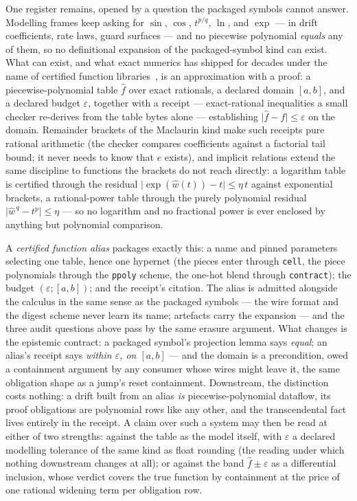 One register remains, opened by a question the packaged symbols
cannot answer. Modelling frames keep asking for $\sin$, $\cos$,
$t^{p/q}$, $\ln$, and $\exp$ --- in drift coefficients, rate laws,
guard surfaces --- and no piecewise polynomial \emph{equals} any of
them, so no definitional expansion of the packaged-symbol kind can
exist. What can exist, and what exact numerics has shipped for
decades under the name of certified function
libraries~\cite{muller2016elementary}, is an
approximation with a proof: a piecewise-polynomial table $\hat f$
over exact rationals, a declared domain $[a, b]$, and a declared
budget $\varepsilon$, together with a receipt --- exact-rational
inequalities a small checker re-derives from the table bytes alone
--- establishing $\lvert \hat f - f \rvert \le \varepsilon$ on the
domain. Remainder brackets of the Maclaurin kind make such receipts
pure rational arithmetic (the checker compares coefficients against
a factorial tail bound; it never needs to know that $e$ exists), and
implicit relations extend the same discipline to functions the
brackets do not reach directly: a logarithm table is certified
through the residual $\lvert \exp(\hat w(t)) - t \rvert \le
\eta\, t$ against exponential brackets, a rational-power table
through the purely polynomial residual $\lvert \hat w^{\,q} - t^p
\rvert \le \eta$ --- so no logarithm and no fractional power is ever
enclosed by anything but polynomial comparison.

A \emph{certified function alias} packages exactly this: a name and
pinned parameters selecting one table, hence one hypernet (the
pieces enter through \texttt{cell}, the piece polynomials through
the \texttt{ppoly} scheme, the one-hot blend through
\texttt{contract}); the budget $(\varepsilon; [a,b])$; and the
receipt's citation. The alias is admitted alongside the calculus in
the same sense as the packaged symbols --- the wire format and the
digest scheme never learn its name; artefacts carry the expansion
--- and the three audit questions above pass by the same erasure
argument. What changes is the epistemic contract: a packaged
symbol's projection lemma says \emph{equal}; an alias's receipt says
\emph{within $\varepsilon$, on $[a,b]$} --- and the domain is a
precondition, owed a containment argument by any consumer whose
wires might leave it, the same obligation shape as a jump's
reset containment. Downstream, the distinction costs nothing: a
drift built from an alias \emph{is} piecewise-polynomial dataflow,
its proof obligations are polynomial rows like any other, and the
transcendental fact lives entirely in the receipt. A claim over such
a system may then be read at either of two strengths: against the
table as the model itself, with $\varepsilon$ a declared modelling
tolerance of the same kind as float rounding (the reading under which
nothing downstream changes at all); or against the band $\hat f \pm
\varepsilon$ as a differential inclusion, whose verdict covers the
true function by containment at the price of one rational widening
term per obligation row.

